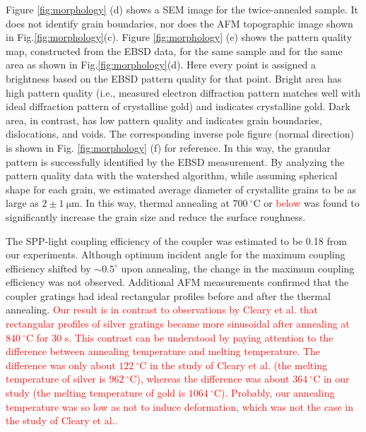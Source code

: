 \documentclass[aip,apl,reprint]{revtex4-1}
\begin{document}
Figure \ref{fig:morphology} (d) shows a SEM image for the twice-annealed sample. It does not identify grain boundaries, nor does the AFM topographic image shown in Fig.\ref{fig:morphology}(c).
Figure \ref{fig:morphology} (e) shows the pattern quality map, constructed from the EBSD data, for the same sample and for the same area as shown in Fig.\ref{fig:morphology}(d). Here every point is assigned a brightness based on the EBSD pattern quality for that point. Bright area has high pattern quality (i.e., measured electron diffraction pattern matches well with ideal diffraction pattern of crystalline gold) and indicates crystalline gold. Dark area, in contrast, has low pattern quality and indicates grain boundaries, dislocations, and voids. The corresponding inverse pole figure (normal direction) is shown in Fig. \ref{fig:morphology} (f) for reference. In this way, the granular pattern is successfully identified by the EBSD measurement. By analyzing the pattern quality data with the watershed algorithm\cite{Petr}, while assuming spherical shape for each grain, we estimated average diameter of crystallite grains to be as large as $2\pm1\:\mathrm{\mu m}$. In this way, thermal annealing at $700\:^\circ\mathrm{C}$ or \textcolor{red}{below} was found to significantly increase the grain size and reduce the surface roughness.

The SPP-light coupling efficiency of the coupler was estimated to be 0.18 from our experiments. Although optimum incident angle for the maximum coupling efficiency shifted by $\sim0.5^\circ$ upon annealing, the change in the maximum coupling efficiency was not observed. Additional AFM measurements confirmed that the coupler gratings had ideal rectangular profiles before and after the thermal annealing. 
\textcolor{red}{Our result is in contrast to observations by Cleary et al.\cite{Cleary2010} that rectangular profiles of silver gratings became more sinusoidal after annealing at $840\:^\circ\mathrm{C}$ for 30 s. 
This contrast can be understood by paying attention to the difference between annealing temperature and melting temperature. The difference was only about $122\:^\circ\mathrm{C}$ in the study of Cleary et al.\cite{Cleary2010} (the melting temperature of silver is $962\:^\circ\mathrm{C}$), whereas the difference was about $364\:^\circ\mathrm{C}$ in our study (the melting temperature of gold is  $1064\:^\circ\mathrm{C}$). Probably, our annealing temperature was so low as not to induce deformation, which was not the case in the study of Cleary et al.\cite{Cleary2010}.}
\end{document}
